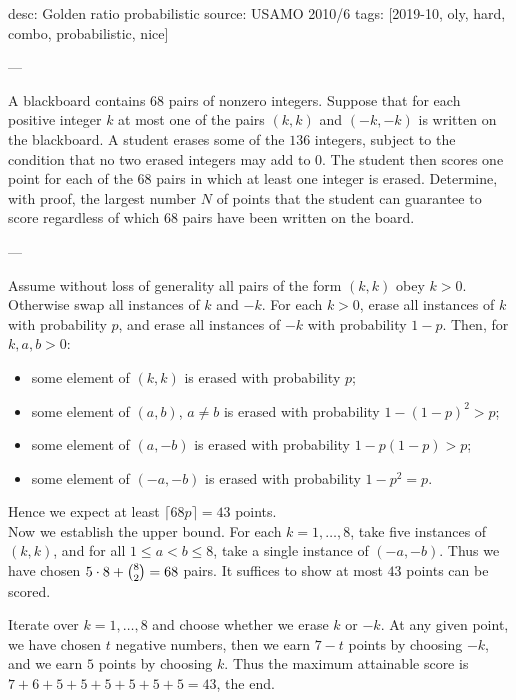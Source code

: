 desc: Golden ratio probabilistic
source: USAMO 2010/6
tags: [2019-10, oly, hard, combo, probabilistic, nice]

---

A blackboard contains $68$ pairs of nonzero integers. Suppose that for each positive integer $k$ at most one of the pairs $(k,k)$ and $(-k,-k)$ is written on the blackboard. A student erases some of the $136$ integers, subject to the condition that no two erased integers may add to 0. The student then scores one point for each of the $68$ pairs in which at least one integer is erased. Determine, with proof, the largest number $N$ of points that the student can guarantee to score regardless of which $68$ pairs have been written on the board.

---

Assume without loss of generality all pairs of the form $(k,k)$ obey $k>0$. Otherwise swap all instances of $k$ and $-k$. For each $k>0$, erase all instances of $k$ with probability $p$, and erase all instances of $-k$ with probability $1-p$. Then, for $k,a,b>0$:
\begin{itemize}[itemsep=0em]
    \item some element of $(k,k)$ is erased with probability $p$;
    \item some element of $(a,b)$, $a\ne b$ is erased with probability $1-(1-p)^2>p$;
    \item some element of $(a,-b)$  is erased with probability $1-p(1-p)>p$;
    \item some element of $(-a,-b)$ is erased with probability $1-p^2=p$.
\end{itemize}
Hence we expect at least $\lceil68p\rceil=43$ points.\\

Now we establish the upper bound. For each $k=1,\ldots,8$, take five instances of $(k,k)$, and for all $1\le a<b\le8$, take a single instance of $(-a,-b)$. Thus we have chosen $5\cdot8+\tbinom82=68$ pairs. It suffices to show at most $43$ points can be scored.

Iterate over $k=1,\ldots,8$ and choose whether we erase $k$ or $-k$. At any given point, we have chosen $t$ negative numbers, then we earn $7-t$ points by choosing $-k$, and we earn $5$ points by choosing $k$. Thus the maximum attainable score is $7+6+5+5+5+5+5+5=43$, the end.
